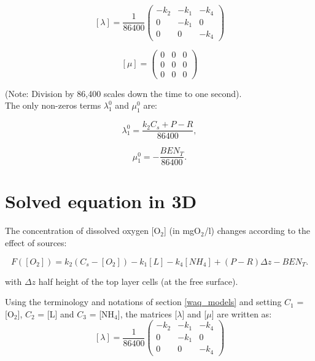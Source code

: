 $$  [\lambda] = \frac{1}{86400}
  \begin{pmatrix}
    -k_2 & -k_1  & -k_4 \\
     0   & -k_1  & 0    \\
     0   &  0    & -k_4
  \end{pmatrix}
$$

$$
  [\mu] =
  \begin{pmatrix}
     0  & 0 & 0 \\
     0  & 0 & 0 \\
     0  & 0 & 0
  \end{pmatrix}
$$

(Note: Division by 86,400 scales down the time to one second).\\

The only non-zeros terms $ \lambda_1^0$ and $ \mu_1^0$ are:

\begin{equation}
  \lambda_1^0 = \frac{k_2 C_s + P - R}{86400},
\end{equation}

\begin{equation}
  \mu_1^0 = -\frac{BEN_T}{86400}.
\end{equation}

\section{Solved equation in 3D}

The concentration of dissolved oxygen [O$_2$] (in mgO$_2$/l) changes
according to the effect of sources:

\begin{equation}
  F([O_2]) = k_2 (C_s - [O_2]) -k_1 [L] - k_4 [NH_4] + (P - R) \Delta z - BEN_T.
\end{equation}

with $\Delta z$ half height of the top layer cells (at the free surface).

Using the terminology and notations of section \ref{waq_models}
and setting $C_1$ = [O$_2$], $C_2$ = [L] and $C_3$ = [NH$_4$],
the matrices [$ \lambda $] and [$ \mu $]
are written as:\\

$$  [\lambda] = \frac{1}{86400}
  \begin{pmatrix}
    -k_2 & -k_1  & -k_4 \\
     0   & -k_1  & 0    \\
     0   &  0    & -k_4
  \end{pmatrix}
$$

